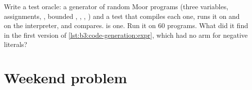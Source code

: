 \begin{exercise}[$\star\star\star$]\label{exo:b3:code-generation:12}
Write a test oracle: a generator of random Moor programs (three variables, assignments, , bounded , \code{&&}, \code{||}, \code{!}) and a test that compiles each one, runs it on  and on the interpreter, and compares.  is one. Run it on 60 programs. What did it find in the first version of \cref{lst:b3:code-generation:expr}, which had no arm for negative literals?
\end{exercise}

\section{Weekend problem}\label{sec:b3:code-generation:problem}

